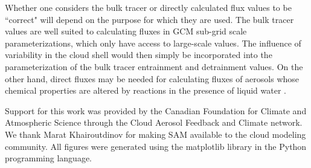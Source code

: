 \documentclass[12pt]{article}
\begin{document}
Whether one considers the bulk tracer or directly calculated flux values to be 
``correct" will depend on the purpose for which they are used.  The bulk tracer 
values are well suited to calculating fluxes in GCM sub-grid scale 
parameterizations, which only have access to large-scale values.  The influence 
of variability in the cloud shell would then simply be incorporated into the 
parameterization of the bulk tracer entrainment and detrainment values.  On the 
other hand, direct fluxes may be needed for calculating fluxes of aerosols whose 
chemical properties are altered by reactions in the presence of liquid water 
\citep{Hoppel1994}.

\begin{acknowledgment} 
Support for this work was provided by the Canadian Foundation for Climate and 
Atmospheric Science through the Cloud Aerosol Feedback and Climate network.
We thank Marat Khairoutdinov for making SAM available to the cloud modeling 
community.  All figures were generated using the matplotlib library in the 
Python programming language.
\end{acknowledgment}

{}
{\clearpage}

{}
{\clearpage}



\end{document}
